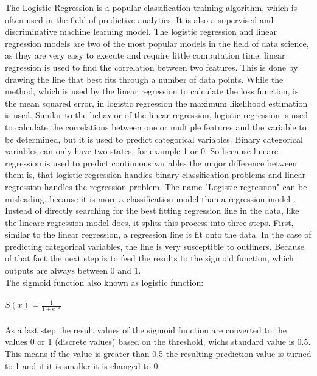 \documentclass[../masterarbeit.tex]{subfiles}
\begin{document}
The Logistic Regression is a popular classification training algorithm, which is often used in the field of predictive analytics. It is also a supervised and discriminative machine learning model. \autocite[]{ibm-logistic-regression:2022} 
The logistic regression and linear regression models are two of the most popular models in the field of data science, as they are very easy to execute and require little computation time. linear regression is used to find the correlation between two features. This is done by drawing the line that best fits through a number of data points. While the method, which is used by the linear regression to calculate the loss function, is the mean squared error, in logistic regression the maximum likelihood estimation is used. Similar to the behavior of the linear regression, logistic regression is used to calculate the correlations between one or multiple features and the variable to be determined, but it is used to predict categorical variables.  Binary categorical variables can only have two states, for example 1 or 0. So because lineare regression is used to predict continuous variables the major difference between them is, that logistic regression handles binary classification problems and linear regression handles the regression problem. \autocite[]{BELYADI2021169} \textcite[]{ibm-logistic-regression:2022} \textcite[]{Sourav:2020} The name "Logistic regression" can be misleading, because it is more a classification model than a regression model \textcite[]{SUBASI202091}. Instead of directly searching for the best fitting regression line in the data, like the lineare regression model does, it splits this process into three steps. First, similar to the linear regression, a regression line is fit onto the data. In the case of predicting categorical variables, the line is very susceptible to outliners. Because of that fact the next step is to feed the results to the sigmoid function, which outputs are always between 0 and 1. \autocite[]{ibm-logistic-regression:2022} \textcite[]{Sourav:2020} \textcite[]{BELYADI2021169}\\
The sigmoid function also known as logistic function: \\~\\
\( S(x) = \frac{1}{1 + e^{-x}}\) \hfill \textcite[]{Sourav:2020} \textcite[]{BELYADI2021169} \\~\\
As a last step the result values of the sigmoid function are converted to the values 0 or 1 (discrete values) based on the threshold, wichs standard value is 0.5. This means if the value is greater than 0.5 the resulting prediction value is turned to 1 and if it is smaller it is changed to 0. \autocite[]{Sourav:2020} \textcite[]{BELYADI2021169}
\end{document}

